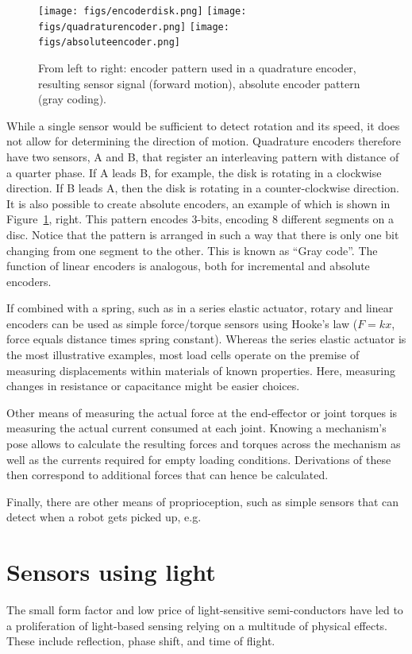 \begin{figure}
	\centering
		\texttt{[image: figs/encoderdisk.png]}
		\texttt{[image: figs/quadraturencoder.png]}
		\texttt{[image: figs/absoluteencoder.png]}
	\caption{From left to right: encoder pattern used in a quadrature encoder, resulting sensor signal (forward motion), absolute encoder pattern (gray coding).}
	\label{fig:encoders}
\end{figure}

While a single sensor would be sufficient to detect rotation and its speed, it does not allow for determining the direction of motion. Quadrature encoders therefore have two sensors, A and B, that register an interleaving pattern with distance of a quarter phase. If A leads B, for example, the disk is rotating in a clockwise direction. If B leads A, then the disk is rotating in a counter-clockwise direction. It is also possible to create absolute encoders, an example of which is shown in Figure~\ref{fig:encoders}, right. This pattern encodes 3-bits, encoding 8 different segments on a disc. Notice that the pattern is arranged in such a way that there is only one bit changing from one segment to the other. This is known as ``Gray code''. The function of linear encoders is analogous, both for incremental and absolute encoders.

If combined with a spring, such as in a series elastic actuator, rotary and linear encoders can be used as simple force/torque sensors using Hooke's law ($F=kx$, force equals distance times spring constant). Whereas the series elastic actuator is the most illustrative examples, most load cells operate on the premise of measuring displacements within materials of known properties. Here, measuring changes in resistance or capacitance might be easier choices.

Other means of measuring the actual force at the end-effector or joint torques is measuring the actual current consumed at each joint. Knowing a mechanism's pose allows to calculate the resulting forces and torques across the mechanism as well as the currents required for empty loading conditions. Derivations of these then correspond to additional forces that can hence be calculated.

Finally, there are other means of proprioception, such as simple sensors that can detect when a robot gets picked up, e.g.

\section{Sensors using light}
The small form factor and low price of light-sensitive semi-conductors have led to a proliferation of light-based sensing relying on a multitude of physical effects. These include reflection, phase shift, and time of flight.

